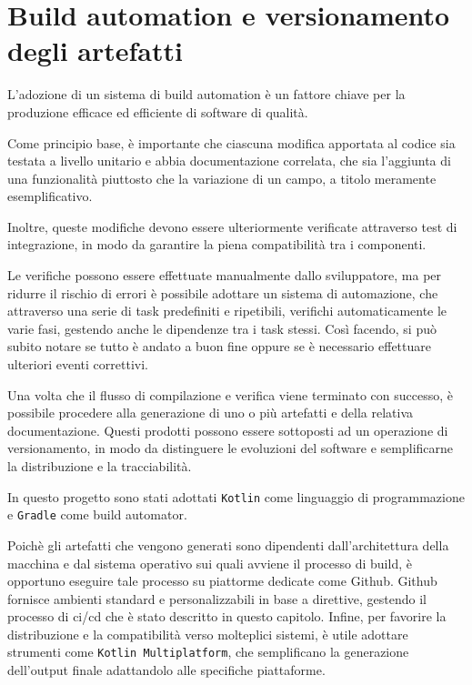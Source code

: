 \documentclass[12pt,a4paper,openright,twoside]{book}
\begin{document}
\chapter{Build automation e versionamento degli artefatti}
L'adozione di un sistema di build automation è un fattore chiave per la produzione
efficace ed efficiente di software di qualità.

Come principio base, è importante che ciascuna modifica apportata al codice
sia testata a livello unitario e abbia documentazione correlata, che sia l'aggiunta 
di una funzionalità piuttosto che la variazione di un campo, a titolo meramente
esemplificativo. 

Inoltre, queste modifiche devono essere ulteriormente 
verificate attraverso test di integrazione, in modo da garantire la piena
compatibilità tra i componenti. 

Le verifiche possono essere effettuate 
manualmente dallo sviluppatore, ma per ridurre il rischio di errori è
possibile adottare un sistema di automazione, che attraverso una serie di task predefiniti
e ripetibili, verifichi automaticamente le varie fasi,
gestendo anche le dipendenze tra i task stessi.
Così facendo, si può subito notare se tutto è andato a buon fine oppure 
se è necessario effettuare ulteriori eventi correttivi.

Una volta che il flusso di compilazione e verifica viene terminato con successo,
è possibile procedere alla generazione di uno o più artefatti e della relativa documentazione.
Questi prodotti possono essere sottoposti ad un operazione di versionamento,
in modo da distinguere le evoluzioni del software e semplificarne la distribuzione
e la tracciabilità.

In questo progetto sono stati adottati \texttt{Kotlin} come linguaggio di programmazione
e \texttt{Gradle} come build automator.

Poichè gli artefatti che vengono generati sono dipendenti dall'architettura della macchina
e dal sistema operativo sui quali avviene il processo di build, è opportuno eseguire tale processo
su piattorme dedicate come Github.
Github fornisce ambienti standard e personalizzabili
in base a direttive, gestendo il processo di \ac{ci}/\ac{cd} che è stato descritto in questo capitolo. 
Infine, per favorire la distribuzione e la compatibilità verso molteplici sistemi,
è utile adottare strumenti come \texttt{Kotlin Multiplatform},
che semplificano la generazione dell'output finale adattandolo alle specifiche piattaforme. 
\end{document}
